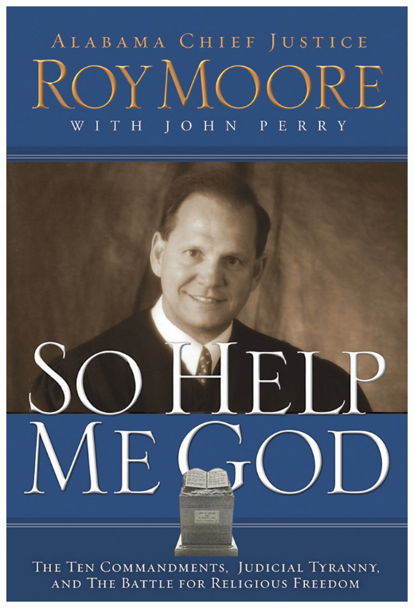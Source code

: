 \begin{frame}
    \centering
    \begin{columns}[onlytextwidth]
        \includegraphics[height=.65\textheight]{img/so-help-me-God.jpg} \\

\end{columns}
\end{frame}
